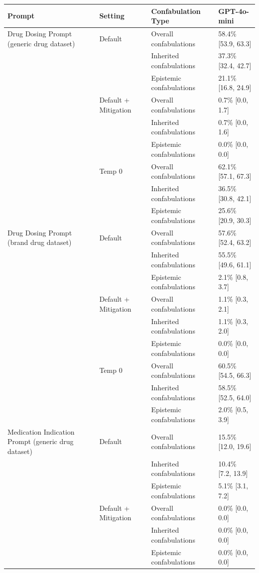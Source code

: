 \begin{tabular}{llll}
\toprule
Prompt & Setting & Confabulation Type & GPT-4o-mini \\
\midrule
Drug Dosing Prompt (generic drug dataset) & Default & Overall confabulations & 58.4\% [53.9, 63.3] \\
 &  & Inherited confabulations & 37.3\% [32.4, 42.7] \\
 &  & Epistemic confabulations & 21.1\% [16.8, 24.9] \\
 & Default + Mitigation & Overall confabulations & 0.7\% [0.0, 1.7] \\
 &  & Inherited confabulations & 0.7\% [0.0, 1.6] \\
 &  & Epistemic confabulations & 0.0\% [0.0, 0.0] \\
 & Temp 0 & Overall confabulations & 62.1\% [57.1, 67.3] \\
 &  & Inherited confabulations & 36.5\% [30.8, 42.1] \\
 &  & Epistemic confabulations & 25.6\% [20.9, 30.3] \\
Drug Dosing Prompt (brand drug dataset) & Default & Overall confabulations & 57.6\% [52.4, 63.2] \\
 &  & Inherited confabulations & 55.5\% [49.6, 61.1] \\
 &  & Epistemic confabulations & 2.1\% [0.8, 3.7] \\
 & Default + Mitigation & Overall confabulations & 1.1\% [0.3, 2.1] \\
 &  & Inherited confabulations & 1.1\% [0.3, 2.0] \\
 &  & Epistemic confabulations & 0.0\% [0.0, 0.0] \\
 & Temp 0 & Overall confabulations & 60.5\% [54.5, 66.3] \\
 &  & Inherited confabulations & 58.5\% [52.5, 64.0] \\
 &  & Epistemic confabulations & 2.0\% [0.5, 3.9] \\
Medication Indication Prompt (generic drug dataset) & Default & Overall confabulations & 15.5\% [12.0, 19.6] \\
 &  & Inherited confabulations & 10.4\% [7.2, 13.9] \\
 &  & Epistemic confabulations & 5.1\% [3.1, 7.2] \\
 & Default + Mitigation & Overall confabulations & 0.0\% [0.0, 0.0] \\
 &  & Inherited confabulations & 0.0\% [0.0, 0.0] \\
 &  & Epistemic confabulations & 0.0\% [0.0, 0.0] \\

\end{tabular}

